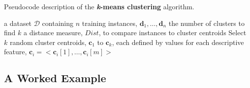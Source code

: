 \documentclass[xcolor={table}]{beamer}
\newcommand{\keywordAlias}[2]{{\textbf{#1}}\index{#2}}
\begin{document}
\begin{frame}[plain]
\scriptsize{Pseudocode description of the \keywordAlias{\textit{k}-means clustering}{k-means clustering} algorithm.}
\begin{footnotesize}
\begin{algorithmic}[1]
\Require a dataset $\mathcal{D}$ containing $n$ training instances, $\mathbf{d}_1, \ldots, \mathbf{d}_n$ 
\Require the number of clusters to find $k$
\Require a distance measure, ${Dist}$, to compare instances to cluster centroids
\State Select $k$ random cluster centroids, ${\mathbf{c}_1}$ to ${\mathbf{c}_k}$, each defined by values for each descriptive feature, $\mathbf{c}_i = <\mathbf{c}_i[1], \dots, \mathbf{c}_i[m]>$
\Repeat
{}
\end{algorithmic}
\end{footnotesize}
\end{frame}



\subsection{A Worked Example}
\end{document}
